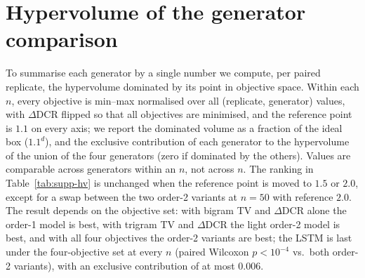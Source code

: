 \section{Hypervolume of the generator comparison}
\label{supp:hv}
To summarise each generator by a single number we compute, per paired replicate, the hypervolume dominated by its point in objective space. Within each $n$, every objective is min--max normalised over all (replicate, generator) values, with $\Delta$DCR flipped so that all objectives are minimised, and the reference point is $1.1$ on every axis; we report the dominated volume as a fraction of the ideal box ($1.1^d$), and the exclusive contribution of each generator to the hypervolume of the union of the four generators (zero if dominated by the others). Values are comparable across generators within an $n$, not across $n$. The ranking in Table~\ref{tab:supp-hv} is unchanged when the reference point is moved to $1.5$ or $2.0$, except for a swap between the two order-2 variants at $n{=}50$ with reference $2.0$. The result depends on the objective set: with bigram TV and $\Delta$DCR alone the order-1 model is best, with trigram TV and $\Delta$DCR the light order-2 model is best, and with all four objectives the order-2 variants are best; the LSTM is last under the four-objective set at every $n$ (paired Wilcoxon $p<10^{-4}$ vs.\ both order-2 variants), with an exclusive contribution of at most 0.006.

